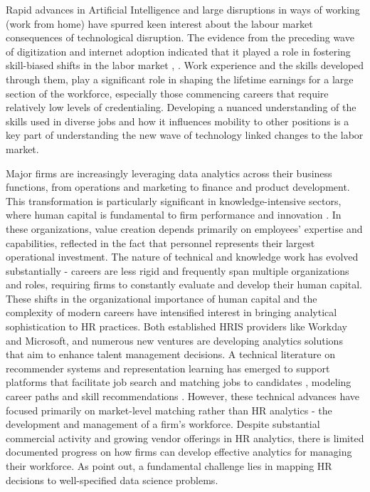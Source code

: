 \documentclass{article}
\begin{document}
Rapid advances in Artificial Intelligence and large disruptions in ways of working (work from home) have spurred keen interest about the labour market consequences of technological disruption. The evidence from the preceding wave of digitization and internet adoption indicated that it played a role in fostering skill-biased shifts in the labor market \autocite{qjeskill}, \autocite{Autor2013}.  Work experience and the skills developed through them, play a significant role in shaping the lifetime earnings for a large section of the workforce, especially those commencing careers that require relatively low levels of credentialing. Developing a nuanced understanding of the skills used in diverse jobs and how it influences mobility to other positions is a key part of understanding the new wave of technology linked changes to the labor market. 


Major firms are increasingly leveraging data analytics across their business functions, from operations and marketing to finance and product development. This transformation is particularly significant in knowledge-intensive sectors, where human capital is fundamental to firm performance and innovation \parencite{riley2017human}. In these organizations, value creation depends primarily on employees' expertise and capabilities, reflected in the fact that personnel represents their largest operational investment. The nature of technical and knowledge work has evolved substantially - careers are less rigid and frequently span multiple organizations and roles, requiring firms to constantly evaluate and develop their human capital. These shifts in the organizational importance of human capital and the complexity of modern careers have intensified interest in bringing analytical sophistication to HR practices. Both established HRIS providers like Workday and Microsoft, and numerous new ventures are developing analytics solutions that aim to enhance talent management decisions. A technical literature on recommender systems \parencite{shaha2012survey,siting2012job} and representation learning \parencite{heap2014combining, zhu2018person, liu2019tripartite, bian2020learning} has emerged to support platforms that facilitate job search \parencite{heap2014combining,giabelli2021skills2job} and matching jobs to candidates \parencite{zhu2018person,qin2020enhanced}, modeling career paths and skill recommendations \parencite{maurya2017bayesian, kokkodis2021demand}. However, these technical advances have focused primarily on market-level matching rather than HR analytics - the development and management of a firm's workforce. Despite substantial commercial activity and growing vendor offerings in HR analytics, there is limited documented progress on how firms can develop effective analytics for managing their workforce. As \textcite{Tambe2019} point out, a fundamental challenge lies in mapping HR decisions to well-specified data science problems.
\end{document}
